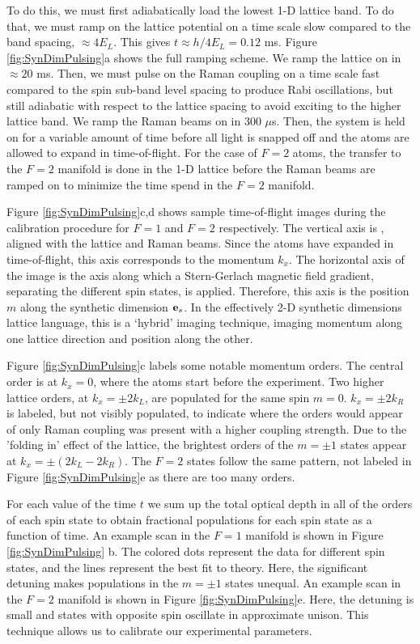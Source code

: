 To do this, we must first adiabatically load the lowest 1-D lattice band. To do that, we must ramp on the lattice potential on a time scale slow compared to the band spacing, $\approx 4 E_L$. This gives $t\approx h/4E_L=0.12$ ms. Figure \ref{fig:SynDimPulsing}a shows the full ramping scheme. We ramp the lattice on in $\approx 20$ ms. Then, we must pulse on the Raman coupling on a time scale fast compared to the spin sub-band level spacing to produce Rabi oscillations, but still adiabatic with respect to the lattice spacing to avoid exciting to the higher lattice band. We ramp the Raman beams on in $300$ $\mu$s. Then, the system is held on for a variable amount of time before all light is snapped off and the atoms are allowed to expand in time-of-flight. For the case of $F=2$ atoms, the transfer to the $F=2$ manifold is done in the 1-D lattice before the Raman beams are ramped on to minimize the time spend in the $F=2$ manifold. 

Figure \ref{fig:SynDimPulsing}c,d shows sample time-of-flight images during the calibration procedure for $F=1$ and $F=2$ respectively. The vertical axis is \ex{}, aligned with the lattice and Raman beams. Since the atoms have expanded in time-of-flight, this axis corresponds to the momentum $k_x$. The horizontal axis of the image is the axis along which a Stern-Gerlach magnetic field gradient, separating the different spin states, is applied. Therefore, this axis is the position $m$ along the synthetic dimension $\textbf{e}_s{}$. In the effectively 2-D synthetic dimensions lattice language, this is a \lq{hybrid}\rq{} imaging technique, imaging momentum along one lattice direction and position along the other.  

Figure \ref{fig:SynDimPulsing}c labels some notable momentum orders. The central order is at $k_x=0$, where the atoms start before the experiment. Two higher lattice orders, at $k_x=\pm2k_L$, are populated for the same spin $m=0$. $k_x=\pm2k_R$ is labeled, but not visibly populated, to indicate where the orders would appear of only Raman coupling was present with a higher coupling strength. Due to the 'folding in' effect of the lattice, the brightest orders of the $m=\pm 1$ states appear at $k_x=\pm (2k_L-2k_R)$. The $F=2$ states follow the same pattern, not labeled in Figure \ref{fig:SynDimPulsing}e as there are too many orders.  

For each value of the time $t$ we sum up the total optical depth in all of the orders of each spin state to obtain fractional populations for each spin state as a function of time. An example scan in the $F=1$ manifold is shown in Figure \ref{fig:SynDimPulsing} b. The colored dots represent the data for different spin states, and the lines represent the best fit to theory. Here, the significant detuning makes populations in the $m=\pm 1$ states unequal. An example scan in the $F=2$ manifold is shown in Figure \ref{fig:SynDimPulsing}e. Here, the detuning is small and states with opposite spin oscillate in approximate unison. This technique allows us to calibrate our experimental parameters.

